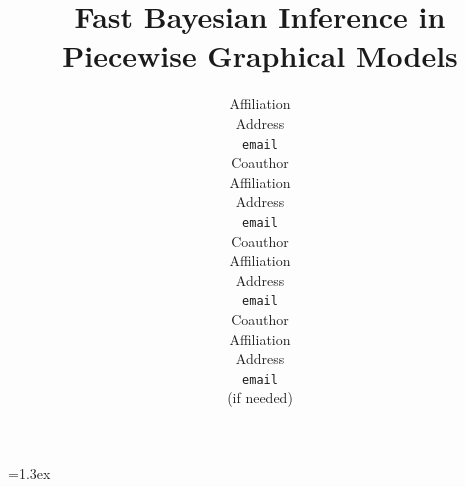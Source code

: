 \def\eqvsp{}  \newdimen\paravsp  \paravsp=1.3ex
\def\paradot#1{\vspace{\paravsp plus 0.5\paravsp minus 0.5\paravsp}\noindent{\bf\boldmath{#1.}}}

\title{
Fast Bayesian Inference in Piecewise Graphical Models
}


\author{
Affiliation \\
Address \\
\texttt{email} \\
\AND
Coauthor \\
Affiliation \\
Address \\
\texttt{email} \\
\And
Coauthor \\
Affiliation \\
Address \\
\texttt{email} \\
\And
Coauthor \\
Affiliation \\
Address \\
\texttt{email} \\
(if needed)\\
}

%

\newcommand{\fix}{\marginpar{FIX}}
\newcommand{\new}{\marginpar{NEW}}




